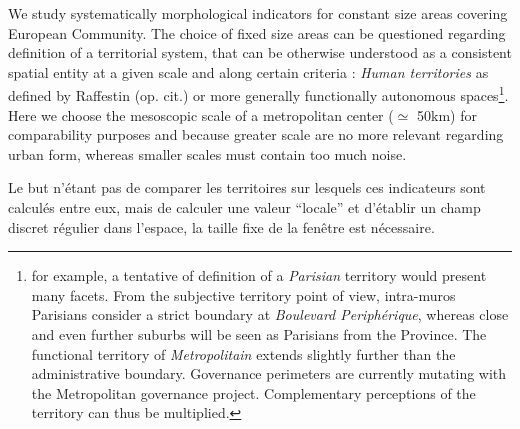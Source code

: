 We study systematically morphological indicators for constant size areas covering European Community. The choice of fixed size areas can be questioned regarding definition of a territorial system, that can be otherwise understood as a consistent spatial entity at a given scale and along certain criteria : \emph{Human territories} as defined by Raffestin (op. cit.) or more generally functionally autonomous spaces\footnote{for example, a tentative of definition of a \textit{Parisian} territory would present many facets. From the subjective territory point of view, intra-muros Parisians consider a strict boundary at \textit{Boulevard Periph{\'e}rique}, 
 whereas close and even further suburbs will be seen as Parisians from the Province. The functional territory of \textit{Metropolitain} extends slightly further than the administrative boundary. 
  Governance perimeters are currently mutating with the Metropolitan governance project. Complementary perceptions of the territory can thus be multiplied.}. Here we choose the mesoscopic scale of a metropolitan center ($\simeq$ 50km) for comparability purposes and because greater scale are no more relevant regarding urban form, whereas smaller scales must contain too much noise. 
  
  

Le but n'étant pas de comparer les territoires sur lesquels ces indicateurs sont calculés entre eux, mais de calculer une valeur ``locale'' et d'établir un champ discret régulier dans l'espace, la taille fixe de la fenêtre est nécessaire.   




%



